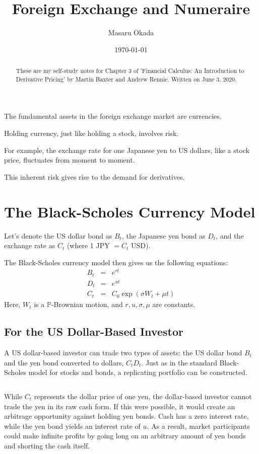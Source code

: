 \documentclass[uplatex,a4j,12pt,dvipdfmx]{jsarticle}
\title{Foreign Exchange and Numeraire}
\author{Masaru Okada
}
\date{ \today }
\begin{document}
\maketitle

\begin{abstract}
	These are my self-study notes for Chapter 3 of 'Financial Calculus: An Introduction to Derivative Pricing' by Martin Baxter and Andrew Rennie. Written on June 3, 2020.
\end{abstract}

The fundamental assets in the foreign exchange market are currencies.

Holding currency, just like holding a stock, involves risk.

For example, the exchange rate for one Japanese yen to US dollars, like a stock price, fluctuates from moment to moment.

This inherent risk gives rise to the demand for derivatives.

\section{The Black-Scholes Currency Model}

Let's denote the US dollar bond as $B_{t}$, the Japanese yen bond as $D_{t}$, and the exchange rate as $C_{t}$ (where 1 JPY $= C_{t}$ USD).

The Black-Scholes currency model then gives us the following equations:
%
%
%
\begin{eqnarray*}
	B_{t}
	&=&
	e^{rt}
	\\
	D_{t}
	&=&
	e^{ut}
	\\
	C_{t}
	&=&
	C_{0} \exp (\sigma W_{t} + \mu t )
\end{eqnarray*}
%
%
%
Here, $W_{t}$ is a $\mathbb{P}$-Brownian motion, and $r,u,\sigma,\mu$ are constants.

\subsection{For the US Dollar-Based Investor}

A US dollar-based investor can trade two types of assets: the US dollar bond $B_{t}$ and the yen bond converted to dollars, $C_{t}D_{t}$. Just as in the standard Black-Scholes model for stocks and bonds, a replicating portfolio can be constructed.

${}$

While $C_{t}$ represents the dollar price of one yen, the dollar-based investor cannot trade the yen in its raw cash form. If this were possible, it would create an arbitrage opportunity against holding yen bonds. Cash has a zero interest rate, while the yen bond yields an interest rate of $u$. As a result, market participants could make infinite profits by going long on an arbitrary amount of yen bonds and shorting the cash itself.
\end{document}
